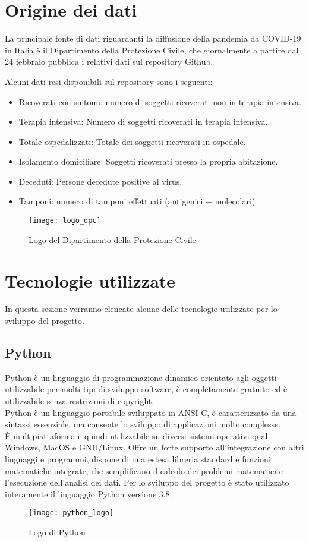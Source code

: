 
\section{Origine dei dati}
La principale fonte di dati riguardanti la diffusione della pandemia da COVID-19 in Italia è il Dipartimento della Protezione Civile, che giornalmente a partire dal 24 febbraio pubblica i relativi dati sul repository Github\cite{repository}.

Alcuni dati resi disponibili sul repository sono i seguenti:
\begin{itemize}
    \item Ricoverati con sintomi: numero di soggetti ricoverati non in terapia intensiva.
    \item Terapia intensiva: Numero di soggetti ricoverati in terapia intensiva.
    \item Totale ospedalizzati: Totale dei soggetti ricoverati in ospedale.
    \item Isolamento domiciliare: Soggetti ricoverati presso la propria abitazione.
    \item Deceduti: Persone decedute positive al virus.
    \item Tamponi: numero di tamponi effettuati (antigenici + molecolari)
\end{itemize}


\begin{figure}[htp]
    \centering
    \texttt{[image: logo\_dpc]}
    \caption{Logo del Dipartimento della Protezione Civile}
\end{figure}


\section{Tecnologie utilizzate}
In questa sezione verranno elencate alcune delle tecnologie utilizzate per lo sviluppo del progetto.

\subsection{Python}
Python è un linguaggio di programmazione dinamico orientato agli oggetti utilizzabile per molti tipi di sviluppo software, è completamente gratuito ed è utilizzabile senza restrizioni di copyright.\\
Python è un linguaggio portabile sviluppato in ANSI C, è caratterizzato da una sintassi essenziale, ma consente lo sviluppo di applicazioni molto complesse.\\
È multipiattaforma e quindi utilizzabile su diversi  sistemi operativi quali Windows, MacOS e GNU/Linux.
Offre un forte supporto all'integrazione con altri linguaggi e programmi, dispone di una estesa libreria standard e funzioni matematiche integrate, che semplificano il calcolo dei problemi matematici e l'esecuzione dell'analisi dei dati.
Per lo sviluppo del progetto è stato utilizzato interamente il linguaggio Python versione 3.8.
\begin{figure}[htp]
    \centering
    \texttt{[image: python\_logo]}
    \caption{Logo di Python}
\end{figure}

